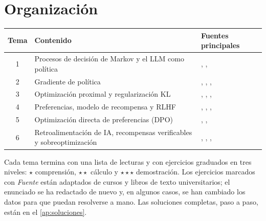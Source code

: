 \documentclass[11pt,a4paper,twoside,openany]{book}
\begin{document}
\section*{Organización}
\begin{center}\small
\begin{tabular}{@{}cll@{}}
\toprule
Tema & Contenido & Fuentes principales \\
\midrule
1 & Procesos de decisión de Markov y el LLM como política & \cite{sb}, \cite{silver}, \cite{cs336} \\
2 & Gradiente de política & \cite{sb}, \cite{cs285}, \cite{williams}, \cite{gae} \\
3 & Optimización proximal y regularización KL & \cite{cs285}, \cite{ppo}, \cite{instructgpt}, \cite{dpo} \\
4 & Preferencias, modelo de recompensa y RLHF & \cite{bt}, \cite{christiano}, \cite{stiennon}, \cite{instructgpt} \\
5 & Optimización directa de preferencias (DPO) & \cite{dpo}, \cite{cs234}, \cite{cs336a5s} \\
6 & Retroalimentación de IA, recompensas verificables y sobreoptimización & \cite{cai}, \cite{deepseekmath}, \cite{r1}, \cite{gao} \\
\bottomrule
\end{tabular}
\end{center}

Cada tema termina con una lista de lecturas y con ejercicios graduados en tres niveles: $\star$ comprensión, $\star\star$ cálculo y $\star\star\star$ demostración. Los ejercicios marcados con \emph{Fuente} están adaptados de cursos y libros de texto universitarios; el enunciado se ha redactado de nuevo y, en algunos casos, se han cambiado los datos para que puedan resolverse a mano. Las soluciones completas, paso a paso, están en el \cref{ap:soluciones}.
\end{document}
